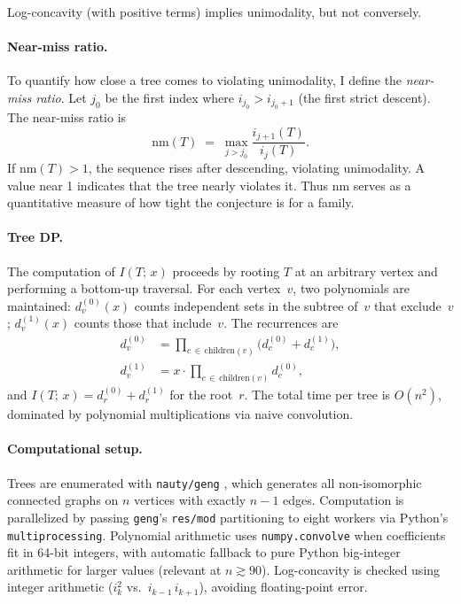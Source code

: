 \documentclass[12pt,oneside]{article}
\theoremstyle{remark}
\newcommand{\nm}{\mathrm{nm}}             %
\begin{document}
Log-concavity (with positive terms) implies unimodality, but not conversely.

\paragraph*{Near-miss ratio.}
To quantify how close a tree comes to violating unimodality, I define the \emph{near-miss ratio}.
Let $j_0$ be the first index where $i_{j_0} > i_{j_0+1}$ (the first strict descent).
The near-miss ratio is
\[
  \nm(T) \;=\; \max_{j > j_0} \frac{i_{j+1}(T)}{i_j(T)}.
\]
If $\nm(T) > 1$, the sequence rises after descending, violating unimodality.
A value near 1 indicates that the tree nearly violates it.
Thus $\nm$ serves as a quantitative measure of how tight the conjecture is for a family.

\paragraph*{Tree DP.}
The computation of $I(T;\, x)$ proceeds by rooting $T$ at an arbitrary vertex and performing a bottom-up traversal.
For each vertex~$v$, two polynomials are maintained: $d_v^{(0)}(x)$ counts independent sets in the subtree of~$v$ that exclude~$v$; $d_v^{(1)}(x)$ counts those that include~$v$.
The recurrences are
\begin{align}
  d_v^{(0)} &= \prod_{c \,\in\, \mathrm{children}(v)} \bigl(d_c^{(0)} + d_c^{(1)}\bigr), \label{eq:dp0}\\
  d_v^{(1)} &= x \cdot \prod_{c \,\in\, \mathrm{children}(v)} d_c^{(0)}, \label{eq:dp1}
\end{align}
and $I(T;\, x) = d_r^{(0)} + d_r^{(1)}$ for the root~$r$.
The total time per tree is $O(n^2)$, dominated by polynomial multiplications via naive convolution.

\paragraph*{Computational setup.}
Trees are enumerated with \texttt{nauty/geng} \citep{mckay2014}, which generates all non-isomorphic connected graphs on $n$ vertices with exactly $n - 1$ edges.
Computation is parallelized by passing \texttt{geng}'s \texttt{res/mod} partitioning to eight workers via Python's \texttt{multiprocessing}.
Polynomial arithmetic uses \texttt{numpy.convolve} when coefficients fit in 64-bit integers, with automatic fallback to pure Python big-integer arithmetic for larger values (relevant at $n \gtrsim 90$).
Log-concavity is checked using integer arithmetic ($i_k^2$ vs.\ $i_{k-1}\, i_{k+1}$), avoiding floating-point error.
\end{document}
